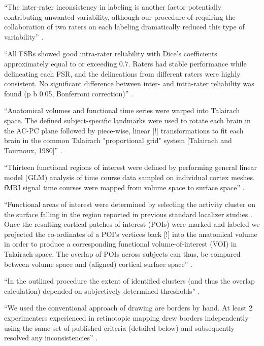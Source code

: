 ``The inter-rater inconsistency in labeling is another factor potentially
contributing unwanted variability, although our procedure of requiring the
collaboration of two raters on each labeling dramatically reduced this type of
variability'' \citep{zhen2015quantifying}.

``All FSRs showed good intra-rater reliability with Dice's coefficients
approximately equal to or exceeding 0.7.
%
Raters had stable performance while delineating each FSR, and the delineations
from different raters were highly consistent.
%
No significant difference between inter- and intra-rater reliability was found
(p b 0.05, Bonferroni correction)''
\citep{zhen2015quantifying}.



``Anatomical volumes and functional time series were warped into Talairach
space.
%
The defined subject-specific landmarks were used to rotate each brain in the
AC-PC plane followed by piece-wise, linear [!] transformations to fit each brain
in the common Talairach "proportional grid" system [Talairach and Tournoux,
1980]'' \citep{frost2012measuring}.

``Thirteen functional regions of interest were defined by performing general
linear model (GLM) analysis of time course data sampled on individual cortex
meshes.
%
fMRI signal time courses were mapped from volume space to surface
space'' \citep{frost2012measuring}.

``Functional areas of interest were determined by selecting the activity cluster
on the surface falling in the region reported in previous standard localizer
studies \citep{frost2012measuring}.
%
Once the resulting cortical patches of interest (POIs) were marked and labeled
we projected the co-ordinates of a POI's vertices back [!] into the anatomical
volume in order to produce a corresponding functional volume-of-interest (VOI)
in Talairach space.
%
The overlap of POIs across subjects can thus, be compared between volume space
and (aligned) cortical surface space'' \citep{frost2012measuring}.

``In the outlined procedure the extent of identified clusters (and thus the
overlap calculation) depended on subjectively determined thresholds''
\citep{frost2012measuring}.



``We used the conventional approach of drawing are borders by hand.
%
At least 2 experimenters experienced in retinotopic mapping drew borders
independently using the same set of published criteria (detailed below) and
subsequently resolved any inconsistencies'' \citep{wang2015probabilistic}.

